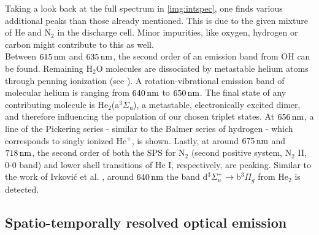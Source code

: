 \documentclass[a4paper,10pt,twoside]{article}
\newcommand{\ix}[1]{_\text{#1}}
\begin{document}
			Taking a look back at the full spectrum in \autoref{img:intspec}, one finds various additional peaks than those already mentioned. This is due to the given mixture of He and N$_2$ in the discharge cell. Minor impurities, like oxygen, hydrogen or carbon might contribute to this as well.\\
			Between $\unit[615]{nm}$ and $\unit[635]{nm}$, the second order of an emission band from OH can be found. Remaining H$\ix{2}$O molecules are dissociated by metastable helium atoms through penning ionization (see \cite{brandenburg2004raeumlich}). A rotation-vibrational emission band of molecular helium is ranging from $\unit[640]{nm}$ to $\unit[650]{nm}$. The final state of any contributing molecule is He$\ix{2}$(a$^{3}\Sigma\ix{u}$), a metastable, electronically excited dimer, and therefore influencing the population of our chosen triplet states. At $\unit[656]{nm}$, a line of the Pickering series - similar to the Balmer series of hydrogen - which corresponds to singly ionized He$^+$, is shown. Lastly, at around $\unit[675]{nm}$ and $\unit[718]{nm}$, the second order of both the SPS for N$\ix{2}$ (second positive system, N$\ix{2}$ II, 0-0 band) and lower shell transitions of He I, respectively, are peaking.	Similar to the work of Ivkovi{\'c} et al. \cite{linratio1_14}, around $\unit[640]{nm}$ the band d$^3\Sigma^+_u\rightarrow$b$^3\Pi_g$ from He$_2$ is detected.
		
		\subsection{Spatio-temporally resolved optical emission}\label{subsec:stroe}
		
\end{document}

